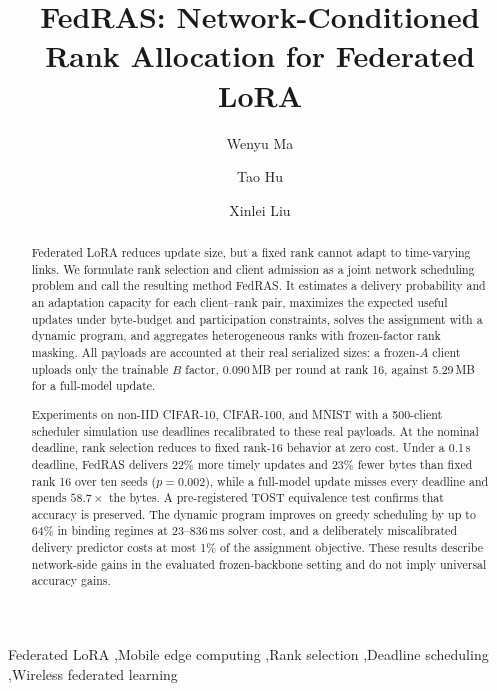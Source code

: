 \documentclass[preprint,12pt]{elsarticle}
\begin{document}
\begin{frontmatter}
\title{FedRAS: Network-Conditioned Rank Allocation for Federated LoRA}
\author[inst1,inst2,inst3]{Wenyu Ma}
\author[inst1,inst2,inst3]{Tao Hu}
\author[inst1,inst2,inst3]{Xinlei Liu}
\address[inst1]{Information Engineering University, Zhengzhou 450001, China}
\address[inst2]{Key Laboratory of Cyberspace Endogenous Safety and Security of Henan Province, Zhengzhou 450001, China}
\address[inst3]{Key Laboratory of Cyberspace Security, Ministry of Education of China, Zhengzhou 450001, China}

\begin{abstract}
Federated LoRA reduces update size, but a fixed rank cannot adapt to time-varying links. We formulate rank selection and client admission as a joint network scheduling problem and call the resulting method FedRAS. It estimates a delivery probability and an adaptation capacity for each client--rank pair, maximizes the expected useful updates under byte-budget and participation constraints, solves the assignment with a dynamic program, and aggregates heterogeneous ranks with frozen-factor rank masking. All payloads are accounted at their real serialized sizes: a frozen-$A$ client uploads only the trainable $B$ factor, 0.090\,MB per round at rank 16, against 5.29\,MB for a full-model update.

Experiments on non-IID CIFAR-10, CIFAR-100, and MNIST with a 500-client scheduler simulation use deadlines recalibrated to these real payloads. At the nominal deadline, rank selection reduces to fixed rank-16 behavior at zero cost. Under a 0.1\,s deadline, FedRAS delivers 22\% more timely updates and 23\% fewer bytes than fixed rank 16 over ten seeds ($p{=}0.002$), while a full-model update misses every deadline and spends $58.7\times$ the bytes. A pre-registered TOST equivalence test confirms that accuracy is preserved. The dynamic program improves on greedy scheduling by up to 64\% in binding regimes at 23--836\,ms solver cost, and a deliberately miscalibrated delivery predictor costs at most 1\% of the assignment objective. These results describe network-side gains in the evaluated frozen-backbone setting and do not imply universal accuracy gains.
\end{abstract}

\begin{keyword}
Federated LoRA \sep Mobile edge computing \sep Rank selection \sep Deadline scheduling \sep Wireless federated learning
\end{keyword}
\end{frontmatter}
\end{document}
